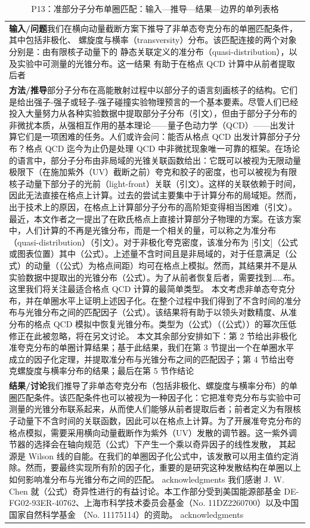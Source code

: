 \documentclass[UTF8,11pt,oneside]{ctexbook}
\begin{document}
\begin{table}[htbp]
  \centering
  \caption*{P13：准部分子分布单圈匹配：输入—推导—结果—边界的单列表格}
  \small
  \begin{tabular}{@{}p{}@{}}
    \toprule
    \textbf{输入/问题}\quad 我们在横向动量截断方案下推导了非单态夸克分布的单圈匹配条件，其中包括非极化、 螺旋度与横率（transversity）分布。该匹配连接的两个对象分别是：由有限核子动量下的 静态关联定义的准分布（quasi-distribution），以及实验中可测量的光锥分布。这一结果 有助于在格点 QCD 计算中从前者提取后者 \\
    \textbf{方法/推导}\quad 部分子分布在高能散射过程中以部分子的语言刻画核子的结构。它们是给出强子-强子或轻子-强子碰撞实验物理预言的一个基本要素。尽管人们已经投入大量努力从各种实验数据中提取部分子分布（引文），但由于部分子分布的非微扰本质，从强相互作用的基本理论——量子色动力学（QCD）——出发计算它们是一项困难的任务。人们或许会问：能否从格点 QCD 出发计算部分子分布？格点 QCD 迄今为止仍是处理 QCD 中非微扰现象唯一可靠的框架。在场论的语言中，部分子分布由非局域的光锥关联函数给出：它既可以被视为无限动量极限下（在施加紫外（UV）截断之前）夸克和胶子的密度，也可以被视为有限核子动量下部分子的光前（light-front）关联（引文）。这样的关联依赖于时间，因此无法直接在格点上计算。过去的尝试主要集中于计算分布的局域矩。然而，出于技术上的原因，在格点上计算部分子分布的高阶矩变得相当困难（引文）。 最近，本文作者之一提出了在欧氏格点上直接计算部分子物理的方案。在该方案中，人们计算的不再是光锥分布，而是一个相关的量，可以称之为准分布（quasi-distribution）（引文）。对于非极化夸克密度，该准分布为 [引文]（公式或图表位置）其中（公式）。上述量不含时间且是非局域的，对于任意满足（公式）的动量（（公式）为格点间距）均可在格点上模拟。然而，其结果并不是从实验数据中提取出的光锥分布（公式）。为了从前者恢复后者，需要找到……布。这里我们将关注最适合格点 QCD 计算的最简单类型。 本文考虑非单态夸克分布，并在单圈水平上证明上述因子化。在整个过程中我们得到了不含时间的准分布与光锥分布之间的匹配因子（公式）。该结果将有助于以领头对数精度、从准分布的格点 QCD 模拟中恢复光锥分布。类型为（公式）（（公式））的幂次压低修正在此被忽略，将在另文讨论。 本文其余部分安排如下：第 2 节给出非极化准夸克分布的单圈计算结果；基于此结果，我们在第 3 节提出一个在单圈水平成立的因子化定理，并提取准分布与光锥分布之间的匹配因子；第 4 节给出夸克螺旋度与横率分布的结果；最后在第 5 节作结论 \\
    \textbf{结果/讨论}\quad 我们推导了非单态夸克分布（包括非极化、螺旋度与横率分布）的单圈匹配条件。该匹配条件也可以被视为一种因子化：它把准夸克分布与实验中可测量的光锥分布联系起来，从而使人们能够从前者提取后者；前者定义为有限核子动量下不含时间的关联函数，因此可以在格点上计算。为了开展准夸克分布的格点模拟，需要采用横向动量截断作为紫外（UV）发散的调节器。这一紫外调节器的选择会在轴向规范（公式）下产生一个乘以奇异因子的线性发散， 其起源是 Wilson 线的自能。在我们的单圈因子化公式中，该发散可以用主值约定消除。然而，要最终实现所有阶的因子化，重要的是研究这种发散结构在单圈以上如何影响准分布与光锥分布之间的匹配。 acknowledgments 我们感谢 J. W. Chen 就（公式）奇异性进行的有益讨论。本工作部分受到美国能源部基金 DE-FG02-93ER-40762、上海市科学技术委员会基金（No. 11DZ2260700）以及中国国家自然科学基金 （No. 11175114）的资助。 acknowledgments \\

\end{tabular}
\end{table}
\end{document}
